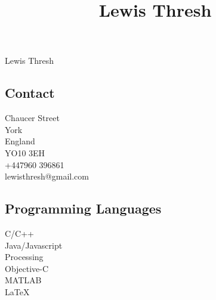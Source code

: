 \documentclass[10pt]{article}
\title{\bfseries\Large Lewis Thresh}
\date{}
\begin{document}
\color{text1} %
\vspace{5mm}

\begin{minipage}[t]{0.18\textwidth} %
    \vspace{0pt} %
    	
    \begin{center}
    \Huge{Lewis}
    \Huge{Thresh}

    \vspace{0mm}
    \noindent\hrulefill
    \end{center}

    \normalsize
    \subsection{Contact}
     Chaucer Street\\
    York\\
    England\\
    YO10 3EH\\
    +447960 396861\\
    lewisthresh@gmail.com\\
    \vspace{5mm}
    
    
    \subsection{Programming Languages} 
    \normalsize C/C++\\
    Java/Javascript\\
    Processing\\
    Objective-C\\
    MATLAB\\
    \LaTeX \\
    

\end{minipage}
\end{document}
